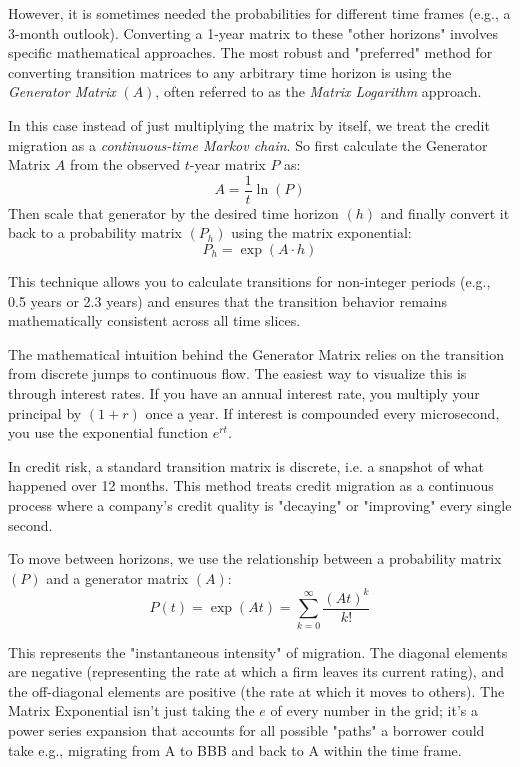 However, it is sometimes needed the probabilities for different time frames (e.g., a 3-month outlook). Converting a 1-year matrix to these "other horizons" involves specific mathematical approaches.
The most robust and "preferred" method for converting transition matrices to any arbitrary time horizon is using the \emph{Generator Matrix} $(A)$, often referred to as the \emph{Matrix Logarithm} approach.

In this case instead of just multiplying the matrix by itself, we treat the credit migration as a \emph{continuous-time Markov chain}. So first calculate the Generator Matrix $A$ from the observed $t$-year matrix $P$ as:
\begin{equation}
A = \frac{1}{t}\ln(P)
\end{equation}
Then scale that generator by the desired time horizon $(h)$ and finally convert it back to a probability matrix $(P_h)$ using the matrix exponential:
\begin{equation}
P_h = \exp(A\cdot h)
\end{equation}

This technique allows you to calculate transitions for non-integer periods (e.g., 0.5 years or 2.3 years) and ensures that the transition behavior remains mathematically consistent across all time slices.

The mathematical intuition behind the Generator Matrix relies on the transition from discrete jumps to continuous flow. The easiest way to visualize this is through interest rates.
If you have an annual interest rate, you multiply your principal by $(1+r)$ once a year. If interest is compounded every microsecond, you use the exponential function $e^{rt}$.

In credit risk, a standard transition matrix is discrete, i.e. a snapshot of what happened over 12 months. This method treats credit migration as a continuous process where a company's credit quality is "decaying" or "improving" every single second.

To move between horizons, we use the relationship between a probability matrix $(P)$ and a generator matrix $(A)$:
\begin{equation}
P(t)=\exp(At)=\sum_{k=0}^{\infty}\frac{(At)^k}{k!}
\end{equation}

This represents the "instantaneous intensity" of migration. The diagonal elements are negative (representing the rate at which a firm leaves its current rating), and the off-diagonal elements are positive (the rate at which it moves to others). The Matrix Exponential isn't just taking the $e$ of every number in the grid; it’s a power series expansion that accounts for all possible "paths" a borrower could take e.g., migrating from A to BBB and back to A within the time frame.

